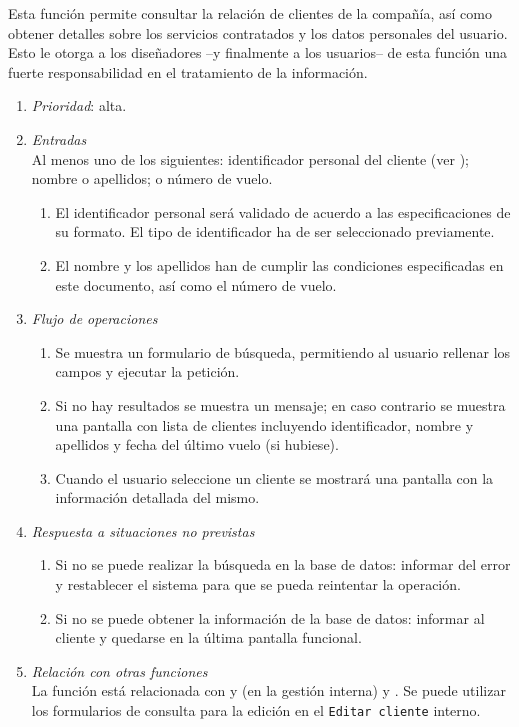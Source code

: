 	Esta función permite consultar la relación de clientes de la compañía, así como obtener detalles sobre los servicios contratados y los datos personales del usuario. Esto le otorga a los diseñadores --y finalmente a los usuarios-- de esta función una fuerte responsabilidad en el tratamiento de la información.

	\begin{enumerate}
		\item \textit{Prioridad}: alta.
		\item \textit{Entradas}\\
			Al menos uno de los siguientes: identificador personal del cliente (ver ); nombre o apellidos; o número de vuelo.
			\begin{enumerate}
				\item El identificador personal será validado de acuerdo a las especificaciones de su formato. El tipo de identificador ha de ser seleccionado previamente.
				\item El nombre y los apellidos han de cumplir las condiciones especificadas en este documento, así como el número de vuelo.
			\end{enumerate}
		\item \textit{Flujo de operaciones}
			\begin{enumerate}
				\item Se muestra un formulario de búsqueda, permitiendo al usuario rellenar los campos y ejecutar la petición.
				\item Si no hay resultados se muestra un mensaje; en caso contrario se muestra una pantalla con lista de clientes incluyendo identificador, nombre y apellidos y fecha del último vuelo (si hubiese).
				\item Cuando el usuario seleccione un cliente se mostrará una pantalla con la información detallada del mismo.
			\end{enumerate}
		\item \textit{Respuesta a situaciones no previstas}
			\begin{enumerate}
				\item Si no se puede realizar la búsqueda en la base de datos: informar del error y restablecer el sistema para que se pueda reintentar la operación.
				\item Si no se puede obtener la información de la base de datos: informar al cliente y quedarse en la última pantalla funcional.
			\end{enumerate}
		\item \textit{Relación con otras funciones}\\
		La función está relacionada con  y  (en la gestión interna) y . Se puede utilizar los formularios de consulta para la edición en el \verb|Editar cliente| interno.
	\end{enumerate}
